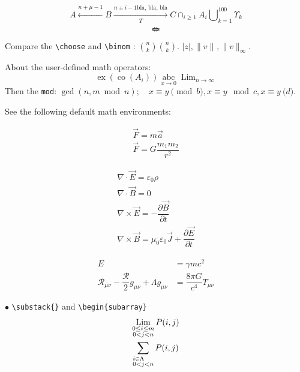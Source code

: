 \documentclass[a4paper,12pt]{amsart}
\theoremstyle{plain}
\theoremstyle{definition}
\theoremstyle{remark}
\numberwithin{equation}{section} %
\newcommand{\calR}{\mathcal{R}}
\DeclareMathOperator*{\Lim}{Lim}
\DeclareMathOperator*{\intersect}{\cap}
\DeclareMathOperator*{\Union}{\bigcup}
\DeclareMathOperator{\ex}{ex}
\DeclareMathOperator{\co}{co}
\providecommand{\abs}[1]{\lvert#1\rvert}
\providecommand{\norm}[2][]{\lVert#2\rVert_{#1}}
\begin{document}
\begin{equation}\label{eq:arrow}
	A \xleftarrow{n+\mu-1} B \xrightarrow[T]{n\pm i-1 \text{bla, bla, bla}}	C \intersect_{i\geq 1} A_{i} \Union_{k=1}^{100}\Upsilon_{k}
\end{equation}
\[ \Leftarrow \mspace{-18.0mu} \Rightarrow \] %

Compare the \verb|\choose| and \verb|\binom| : $ {n \choose k} \binom{n}{k}$. $ \abs{z}, \norm{v}, \norm[\infty]{v} $.

About the user-defined math operators:
\[ \ex(\co(A_{i})) \operatorname*{abc}_{x\to 0} \Lim_{n\to \infty}\]
Then the \verb|mod|: $ \gcd(n,m\bmod n); \quad x \equiv y \pmod b, x \equiv y \mod c, x \equiv y \pod d $.

See the following default math environments:

\begin{multline}\label{eq:newton}
	\vec{F} = m\vec{a} \\
	\vec{F} = G \dfrac{m_{1}m_{2}}{r^{2}}
\end{multline}

\begin{subequations}\label{eq:maxwell}
	\begin{gather}
		\nabla\cdot \vec{E} = \varepsilon_{0}\rho \\
		\nabla \cdot \vec{B} = 0 \\
		\nabla \times \vec{E} = -\dfrac{\partial \vec{B}}{\partial t}\\
		\nabla \times \vec{B} = \mu_{0}\varepsilon_{0} \vec{J} + \dfrac{\partial \vec{E}}{\partial t}
	\end{gather}
\end{subequations}

\begin{equation}\label{eq:einstein}
	\begin{split}
		E& =\gamma mc^{2}
		\\
		\calR_{\mu\nu} - \dfrac{\calR}{2}g_{\mu\nu} + \Lambda g_{\mu\nu} & = \dfrac{8\pi G}{c^{4}} T_{\mu\nu}
	\end{split}
\end{equation}

$\bullet$ \verb|\substack{}| and \verb|\begin{subarray}|
\begin{gather}
	\Lim_{\substack{0\leq i \leq m\\ 0<j<n} } P(i,j)\\
	\sum_{\begin{subarray}{r}
			i\in \Lambda \\ 0<j<n
		\end{subarray}} P(i,j)
\end{gather}
\end{document}
